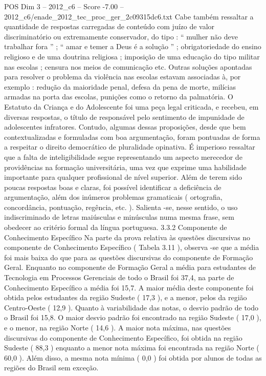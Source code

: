 \begin{textsample}{POS Dim 3 – 2012\_c6 – Score -7.00 – 2012\_c6/enade\_2012\_tec\_proc\_ger\_2c09315dc6.txt}
Cabe também ressaltar a quantidade de respostas carregadas de conteúdo com juízo de valor discriminatório ou extremamente conservador, do tipo : “ mulher não deve trabalhar fora ” ; “ amar e temer a Deus é a solução ” ; obrigatoriedade do ensino religioso e de uma doutrina religiosa ; imposição de uma educação do tipo militar nas escolas ; censura nos meios de comunicação etc.
Outras soluções apontadas para resolver o problema da violência nas escolas estavam associadas à, por exemplo : redução da maioridade penal, defesa da pena de morte, milícias armadas na porta das escolas, punições como o retorno da palmatória.
O Estatuto da Criança e do Adolescente foi uma peça legal criticada, e recebeu, em diversas respostas, o título de responsável pelo sentimento de impunidade de adolescentes infratores.
Contudo, algumas dessas proposições, desde que bem contextualizadas e formuladas com boa argumentação, foram pontuadas de forma a respeitar o direito democrático de pluralidade opinativa.
É imperioso ressaltar que a falta de inteligibilidade segue representando um aspecto merecedor de providências na formação universitária, uma vez que exprime uma habilidade importante para qualquer profissional de nível superior.
Além de terem sido poucas respostas boas e claras, foi possível identificar a deficiência de argumentação, além dos inúmeros problemas gramaticais ( ortografia, concordância, pontuação, regência, etc. ).
Salienta -se, nesse sentido, o uso indiscriminado de letras maiúsculas e minúsculas numa mesma frase, sem obedecer ao critério formal da língua portuguesa. 3.3.2 Componente de Conhecimento Específico Na parte da prova relativa às questões discursivas no componente de Conhecimento Específico ( Tabela 3.11 ), observa -se que a média foi mais baixa do que para as questões discursivas do componente de Formação Geral.
Enquanto no componente de Formação Geral a média para estudantes de Tecnologia em Processos Gerenciais de todo o Brasil foi 37,4, na parte de Conhecimento Específico a média foi 15,7.
A maior média deste componente foi obtida pelos estudantes da região Sudeste ( 17,3 ), e a menor, pelos da região Centro-Oeste ( 12,9 ).
Quanto à variabilidade das notas, o desvio padrão de todo o Brasil foi 15,8.
O maior desvio padrão foi encontrado na região Sudeste ( 17,0 ), e o menor, na região Norte ( 14,6 ).
A maior nota máxima, nas questões discursivas do componente de Conhecimento Específico, foi obtida na região Sudeste ( 88,3 ) enquanto a menor nota máxima foi encontrada na região Norte ( 60,0 ).
Além disso, a mesma nota mínima ( 0,0 ) foi obtida por alunos de todas as regiões do Brasil sem exceção.

\end{textsample}
